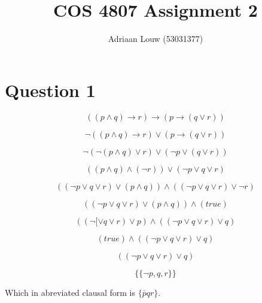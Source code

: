 \documentclass[10pt,a4paper]{article}
\title{COS 4807 Assignment 2}
\author{Adriaan Louw (53031377)}
\begin{document}
\maketitle


\section{Question 1}

\begin{equation}
 ((p\wedge q)\rightarrow r) \rightarrow (p \rightarrow (q\vee r))
\end{equation}

\begin{equation}
 \neg((p \wedge q) \rightarrow r) \vee (p\rightarrow(q\vee r))
\end{equation}

\begin{equation}
 \neg (\neg(p \wedge q) \vee r) \vee (\neg p \vee (q\vee r))
\end{equation}

\begin{equation}
 ((p\wedge q) \wedge(\neg r))\vee (\neg p \vee q \vee r)
\end{equation}

\begin{equation}
 ((\neg p \vee q \vee r)\vee (p \wedge q))\wedge ((\neg p \vee q \vee r) \vee \neg r)
\end{equation}

\begin{equation}
 ((\neg p \vee q \vee r)\vee (p \wedge q))\wedge (true)
\end{equation}

\begin{equation}
 ((\neg [ \vee q \vee r)\vee p)\wedge((\neg p \vee q \vee r )\vee q)
\end{equation}

\begin{equation}
 (true)\wedge((\neg p \vee q \vee r )\vee q)
\end{equation}

\begin{equation}
((\neg p \vee q \vee r )\vee q)
\end{equation}

\begin{equation}
\{\{\neg p, q,r\}\}
\end{equation}

Which in abreviated clausal form is $\{\bar{p}qr\}$.
\end{document}
